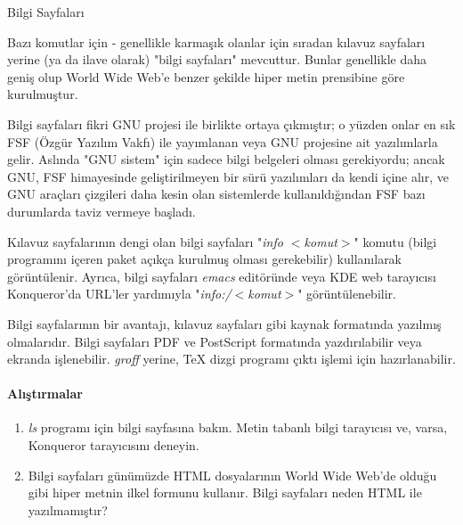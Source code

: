 \begin{section}{Bilgi Sayfaları}

Bazı komutlar için - genellikle karmaşık olanlar için sıradan kılavuz sayfaları yerine (ya da ilave olarak) "bilgi sayfaları" mevcuttur. Bunlar genellikle daha geniş olup World Wide Web'e benzer şekilde hiper metin prensibine göre kurulmuştur.

Bilgi sayfaları fikri GNU projesi ile birlikte ortaya çıkmıştır; o yüzden onlar en sık FSF (Özgür Yazılım Vakfı) ile  yayımlanan veya GNU projesine ait yazılımlarla gelir. Aslında "GNU sistem" için sadece bilgi belgeleri olması gerekiyordu; ancak GNU, FSF himayesinde geliştirilmeyen bir sürü yazılımları da kendi içine alır, ve GNU araçları çizgileri daha kesin olan sistemlerde kullanıldığından FSF bazı durumlarda taviz vermeye başladı.

Kılavuz sayfalarının dengi olan bilgi sayfaları "\emph{info $<$komut$>$}" komutu (bilgi programını içeren paket açıkça kurulmuş olması gerekebilir) kullanılarak görüntülenir. Ayrıca, bilgi sayfaları \emph{emacs} editöründe veya KDE web tarayıcısı Konqueror'da URL'ler yardımıyla "\emph{info:/$<$komut$>$}" görüntülenebilir.

Bilgi sayfalarının bir avantajı, kılavuz sayfaları gibi kaynak formatında yazılmış olmalarıdır. Bilgi sayfaları PDF ve PostScript formatında yazdırılabilir veya ekranda işlenebilir. \emph{groff} yerine, \TeX{} dizgi programı çıktı işlemi için hazırlanabilir.

\paragraph{{\Huge{\PencilLeftDown}}Alıştırmalar}{
\begin{enumerate}
 \item \emph{ls} programı için bilgi sayfasına bakın. Metin tabanlı bilgi tarayıcısı ve, varsa, Konqueror tarayıcısını deneyin.
 \item Bilgi sayfaları günümüzde HTML dosyalarının World Wide Web'de olduğu gibi hiper metnin ilkel formunu kullanır. Bilgi sayfaları neden HTML ile yazılmamıştır?
\end{enumerate}}
\end{section}
